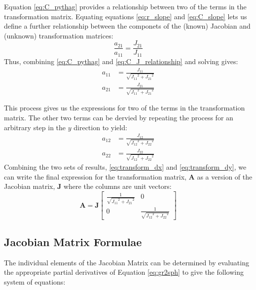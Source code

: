 \documentclass[a4paper,10pt]{article}
\begin{document}
Equation \eqref{eq:C_pythag} provides a relationship between two of the terms in the transformation matrix. Equating equations \eqref{eq:r_slope} and \eqref{eq:C_slope} lets us define a further relationship between the componets of the (known) Jacobian and (unknown) transformation matrices:
\begin{equation}\label{eq:C_J_relationship}
  \frac{a_{21}}{a_{11}} = \frac{J_{21}}{J_{11}}
\end{equation}
Thus, combining \eqref{eq:C_pythag} and \eqref{eq:C_J_relationship} and solving gives:
\begin{subequations}\label{eq:transform_dx}\begin{align}
 a_{11} &= \frac{J_{11}}{\sqrt{{J_{11}}^2+{J_{21}}^2}} \\
 a_{21} &= \frac{J_{21}}{\sqrt{{J_{11}}^2+{J_{21}}^2}}
\end{align}\end{subequations}

This process gives us the expressions for two of the terms in the transformation matrix. The other two terms can be dervied by repeating the process for an arbitrary step in the $y$ direction to yield:
\begin{subequations}\label{eq:transform_dy}\begin{align}
 a_{12} &= \frac{J_{12}}{\sqrt{{J_{12}}^2+{J_{22}}^2}} \\
 a_{22} &= \frac{J_{22}}{\sqrt{{J_{12}}^2+{J_{22}}^2}}
\end{align}\end{subequations}
Combining the two sets of results, \eqref{eq:transform_dx} and \eqref{eq:transform_dy}, we can write the final expression for the transformation matrix, $\mathbf{A}$ as a version of the Jacobian matrix, $\mathbf{J}$ where the columns are unit vectors:
\begin{equation}
  \mathbf{A} = \mathbf{J}
   \left[\begin{matrix}
      \frac{1}{\sqrt{{J_{11}}^2+{J_{21}}^2}}
&     0 \\   0 &
     \frac{1}{\sqrt{{J_{12}}^2+{J_{22}}^2}}
                     \end{matrix}\right]
\end{equation}


\subsection{Jacobian Matrix Formulae}
The individual elements of the Jacobian Matrix can be determined by evaluating the appropriate partial derivatives of Equation \eqref{eq:gr2sph} to give the following system of equations:
\end{document}
